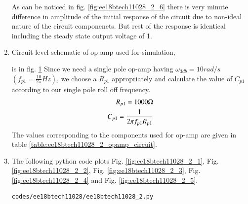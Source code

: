 \begin{enumerate}[label=\arabic*.,ref=\theenumi]
As can be noticed in fig. \ref{fig:ee18btech11028_2_6} there is very minute difference in amplitude of the initial response of the circuit due to non-ideal nature of the circuit componenets. But rest of the response is identical including the steady state output voltage of 1.
\item
Circuit level schematic of op-amp used for simulation,
\begin{figure}[!ht]
	\begin{center}
		\resizebox{\columnwidth}{!}{}
	\end{center}
\caption{}
\label{fig:ee18btech11028_2_7}
\end{figure}
is in fig. \ref{fig:ee18btech11028_2_7}
Since we need a single pole op-amp having $\omega_{3db}  =  10 rad/s$  $(f_{p1} = \frac{10}{2\pi} Hz)$,
we choose a $R_{p1}$ appropriately and calculate the value of $C_{p1}$ according to our single pole roll off frequency.
\begin{align}
    R_{p1}  = 1000 \ohm
    \\
    C_{p1} = \frac{1}{2  \pi f_{p1} R_{p1}}
\end{align}
The values corresponding to the components used for op-amp are given in table \ref{table:ee18btech11028_2_opamp_circuit}. 
\begin{table}[!ht]
    \centering
    
    \caption{}
    \label{table:ee18btech11028_2_opamp_circuit}
\end{table}


\item The following python code plots  Fig. \ref{fig:ee18btech11028_2_1}, Fig. \ref{fig:ee18btech11028_2_2}, Fig. \ref{fig:ee18btech11028_2_3}, Fig. \ref{fig:ee18btech11028_2_4} and Fig. \ref{fig:ee18btech11028_2_5}.
\begin{lstlisting}
codes/ee18btech11028/ee18btech11028_2.py
\end{lstlisting}

\end{enumerate}